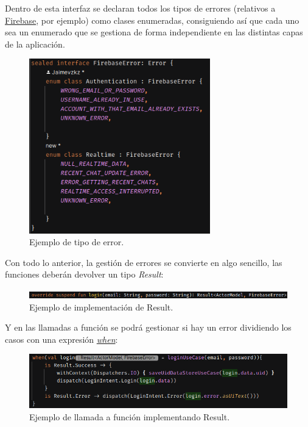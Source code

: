 Dentro de esta interfaz se declaran todos los tipos de errores (relativos a \hyperlink{subsec:firebase}{Firebase}, por ejemplo) como clases enumeradas, consiguiendo así que cada uno sea un enumerado que se gestiona de forma independiente en las distintas capas de la aplicación.
\begin{figure}[h]
    \centering
    \includegraphics[width = 0.7\textwidth]{Imagenes/Fuentes/ejemplo_tipo_error.png}
    \caption{Ejemplo de tipo de error.}
    \label{fig:ejemplo_tipo_error}
\end{figure}

Con todo lo anterior, la gestión de errores se convierte en algo sencillo, las funciones deberán devolver un tipo \textit{Result}:
\newpage
\begin{figure}[h]
    \centering
    \includegraphics[width = 1\textwidth]{Imagenes/Fuentes/ejemplo_impl_result.png}
    \caption{Ejemplo de implementación de Result.}
    \label{fig:ejemplo_impl_result}
\end{figure}

Y en las llamadas a función se podrá gestionar si hay un error dividiendo los casos con una expresión \href{https://kotlinlang.org/docs/control-flow.html#when-expression}{\textit{when}}:
\begin{figure}[h]
    \centering
    \includegraphics[width = 1\textwidth]{Imagenes/Fuentes/llamada_funcion_result.png}
    \caption{Ejemplo de llamada a función implementando Result.}
    \label{fig:llamada_funcion_result}
\end{figure}